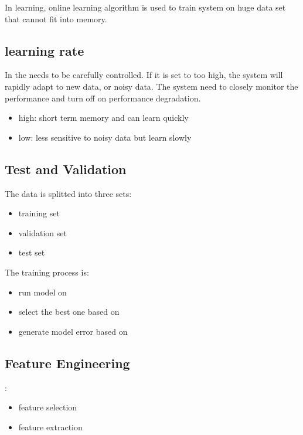 In  learning, online learning algorithm is used to train system on huge data set that cannot fit into memory.

\subsection{learning rate}

In  the  needs to be carefully controlled. If it is set to too high, the system will rapidly adapt to new data, or noisy data. The system need to closely monitor the performance and turn off  on performance degradation. 

\begin{itemize}
	\item high: short term memory and can learn quickly
	\item low: less sensitive to noisy data but learn slowly
\end{itemize}


\subsection{Test and Validation}

The data is splitted into three sets:
\begin{itemize}
	\item training set
	\item validation set
	\item test set
\end{itemize}

The training process is:
\begin{itemize}
	\item run model on 
	\item select the best one based on  
	\item generate model error based on 
\end{itemize}


\subsection{Feature Engineering}

:
\begin{itemize}
	\item feature selection
	\item feature extraction
\end{itemize}

